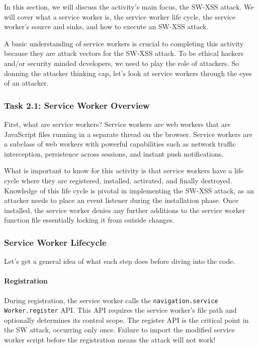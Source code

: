 \documentclass[letterpaper,12pt]{report}
\begin{document}
In this section, we will discuss the activity's main focus, the SW-XSS attack. We will cover what a service worker is, the service worker life cycle, the service worker's source and sinks, and how to execute an SW-XSS attack.

A basic understanding of service workers is crucial to completing this activity because they are attack vectors for the SW-XSS attack. To be ethical hackers and/or security minded developers, we need to play the role of attackers. So donning the attacker thinking cap, let’s look at service workers through the eyes of an attacker.

\subsubsection*{Task 2.1: Service Worker Overview}

First, what are service workers? Service workers are web workers that are JavaScript files running in a separate thread on the browser. Service workers are a subclass of web workers with powerful capabilities such as network traffic interception, persistence across sessions, and instant push notifications. 

What is important to know for this activity is that service workers have a life cycle where they are registered, installed, activated, and finally destroyed. Knowledge of this life cycle is pivotal in implementing the SW-XSS attack, as an attacker needs to place an event listener during the installation phase. Once installed, the service worker denies any further additions to the service worker function file essentially locking it from outside changes.

\subsubsection*{Service Worker Lifecycle}

Let’s get a general idea of what each step does before diving into the code.

\paragraph*{Registration}

During registration, the service worker calls the \texttt{navigation.service\\Worker.register} API. This API requires the service worker's file path and optionally determines its control scope. The register API is the critical point in the SW attack, occurring only once. Failure to import the modified service worker script before the registration means the attack will not work! 
\end{document}

